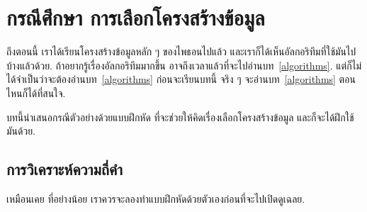 \chapter{กรณีศึกษา การเลือกโครงสร้างข้อมูล}


ถึงตอนนี้ เราได้เรียนโครงสร้างข้อมูลหลัก ๆ ของไพธอนไปแล้ว
และเราก็ได้เห็นอัลกอริทึมที่ใช้มันไปบ้างแล้วด้วย.
ถ้าอยากรู้เรื่องอัลกอริทึมมากขึ้น อาจถึงเวลาแล้วที่จะไปอ่านบท~\ref{algorithms}.
แต่ก็ไม่ได้จำเป็นว่าจะต้องอ่านบท~\ref{algorithms} ก่อนจะเรียนบทนี้ 
จริง ๆ จะอ่านบท~\ref{algorithms} ตอนไหนก็ได้ที่สนใจ.


บทนี้นำเสนอกรณีตัวอย่างด้วยแบบฝึกหัด 
ที่จะช่วยให้คิดเรื่องเลือกโครงสร้างข้อมูล และก็จะได้ฝึกใช้มันด้วย.

\section{การวิเคราะห์ความถี่คำ}
\label{analysis}


เหมือนเคย ที่อย่างน้อย เราควรจะลองทำแบบฝึกหัดด้วยตัวเองก่อนที่จะไปเปิดดูเฉลย.


